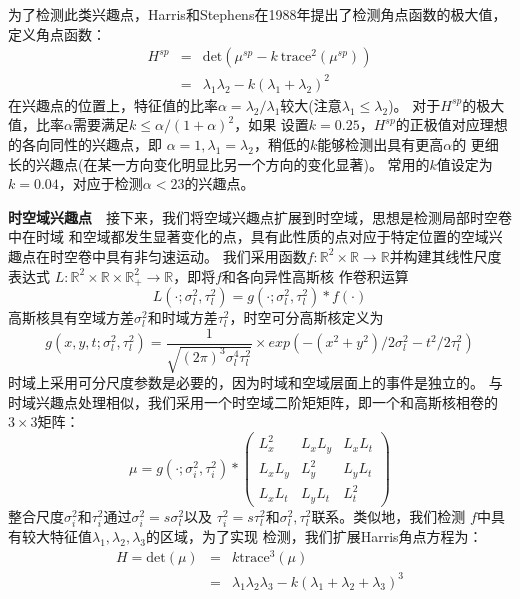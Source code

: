 为了检测此类兴趣点，Harris和Stephens在1988年提出了检测角点函数的极大值，
定义角点函数：
\begin{eqnarray}
    H^{sp}&=&\mathrm{det}(\mu^{sp}-k~\mathrm{trace}^2(\mu^{sp}))\\
    {}&=&\lambda_1\lambda_2-k(\lambda_1+\lambda_2)^2
\end{eqnarray}
在兴趣点的位置上，特征值的比率$\alpha=\lambda_2/\lambda_1$较大(注意$\lambda_1\leq\lambda_2$)。
对于$H^{sp}$的极大值，比率$\alpha$需要满足$k\leq\alpha/(1+\alpha)^2$，如果
设置$k=0.25$，$H^{sp}$的正极值对应理想的各向同性的兴趣点，即
$\alpha=1,\lambda_1=\lambda_2$，稍低的$k$能够检测出具有更高$\alpha$的
更细长的兴趣点(在某一方向变化明显比另一个方向的变化显著)。
常用的$k$值设定为$k=0.04$，对应于检测$\alpha<23$的兴趣点。

\textbf{时空域兴趣点}~~接下来，我们将空域兴趣点扩展到时空域，思想是检测局部时空卷中在时域
和空域都发生显著变化的点，具有此性质的点对应于特定位置的空域兴趣点在时空卷中具有非匀速运动。
我们采用函数$f:\mathbb{R}^2\times\mathbb{R}\to\mathbb{R}$并构建其线性尺度表达式
$L:\mathbb{R}^2\times\mathbb{R}\times\mathbb{R}^2_+\to\mathbb{R}$，即将$f$和各向异性高斯核
作卷积运算
\begin{equation}
    L(\cdot;\sigma_l^2,\tau_l^2)=g(\cdot;\sigma_l^2,\tau_l^2)*f(\cdot)
\end{equation}
高斯核具有空域方差$\sigma_l^2$和时域方差$\tau_l^2$，时空可分高斯核定义为
\begin{equation}
    g(x,y,t;\sigma_l^2,\tau_l^2)=\frac{1}{\sqrt{(2\pi)^3\sigma_l^4\tau_l^2}}\times
    exp(-(x^2+y^2)/2\sigma_l^2-t^2/2\tau_l^2)
\end{equation}
时域上采用可分尺度参数是必要的，因为时域和空域层面上的事件是独立的。
与时域兴趣点处理相似，我们采用一个时空域二阶矩矩阵，即一个和高斯核相卷的$3\times3$矩阵：
\begin{equation}
    \mu=g(\cdot;\sigma_i^2,\tau_i^2)*\left(
        \begin{array}{ccc}
            L_x^2&L_xL_y&L_xL_t\\
            L_xL_y&L_y^2&L_yL_t\\
            L_xL_t&L_yL_t&L_t^2
        \end{array}
    \right)
\end{equation}
整合尺度$\sigma_i^2$和$\tau_i^2$通过$\sigma_i^2=s\sigma_l^2$以及
$\tau_i^2=s\tau_l^2$和$\sigma_l^2,\tau_l^2$联系。类似地，我们检测
$f$中具有较大特征值$\lambda_1,\lambda_2,\lambda_3$的区域，为了实现
检测，我们扩展Harris角点方程为：
\begin{eqnarray}
    H=\mathrm{det}(\mu)&=&k\mathrm{trace}^3(\mu)\\
    {}&=&\lambda_1\lambda_2\lambda_3-k(\lambda_1+\lambda_2+\lambda_3)^3
\end{eqnarray}
